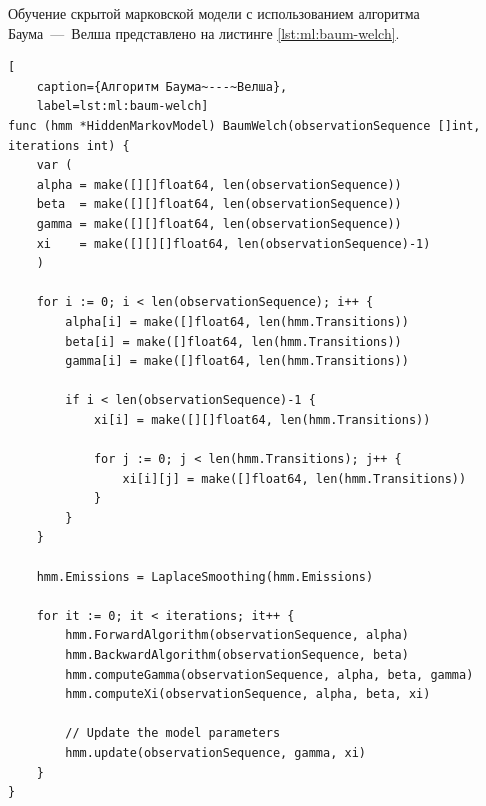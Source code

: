 Обучение скрытой марковской модели с использованием алгоритма Баума~---~Велша представлено на листинге \ref{lst:ml:baum-welch}.
\begin{lstlisting}[
	caption={Алгоритм Баума~---~Велша},
	label=lst:ml:baum-welch]
func (hmm *HiddenMarkovModel) BaumWelch(observationSequence []int,
iterations int) {
	var (
	alpha = make([][]float64, len(observationSequence))
	beta  = make([][]float64, len(observationSequence))
	gamma = make([][]float64, len(observationSequence))
	xi    = make([][][]float64, len(observationSequence)-1)
	)
	
	for i := 0; i < len(observationSequence); i++ {
		alpha[i] = make([]float64, len(hmm.Transitions))
		beta[i] = make([]float64, len(hmm.Transitions))
		gamma[i] = make([]float64, len(hmm.Transitions))
		
		if i < len(observationSequence)-1 {
			xi[i] = make([][]float64, len(hmm.Transitions))
			
			for j := 0; j < len(hmm.Transitions); j++ {
				xi[i][j] = make([]float64, len(hmm.Transitions))
			}
		}
	}
	
	hmm.Emissions = LaplaceSmoothing(hmm.Emissions)
	
	for it := 0; it < iterations; it++ {
		hmm.ForwardAlgorithm(observationSequence, alpha)
		hmm.BackwardAlgorithm(observationSequence, beta)
		hmm.computeGamma(observationSequence, alpha, beta, gamma)
		hmm.computeXi(observationSequence, alpha, beta, xi)
		
		// Update the model parameters
		hmm.update(observationSequence, gamma, xi)
	}
}
\end{lstlisting}

